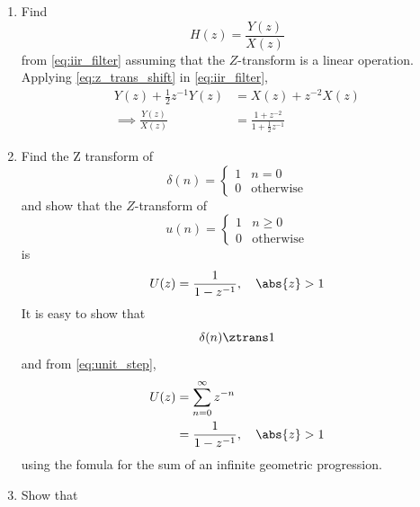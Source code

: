 \documentclass[journal,12pt,twocolumn]{IEEEtran}
\renewcommand\thesection{\arabic{section}}
\begin{document}
\begin{enumerate}[label=\thesection.\arabic*]
	\item Find
	      \begin{equation}
		      H(z) = \frac{Y(z)}{X(z)}
	      \end{equation}
	      from  \eqref{eq:iir_filter} assuming that the $Z$-transform is a linear operation.
	      \\
	      \solution  Applying \eqref{eq:z_trans_shift} in \eqref{eq:iir_filter},
	      \begin{align}
		      Y(z) + \frac{1}{2}z^{-1}Y(z) & = X(z)+z^{-2}X(z)
		      \\
		      \implies \frac{Y(z)}{X(z)}   & = \frac{1 + z^{-2}}{1 + \frac{1}{2}z^{-1}}
		      \label{eq:freq_resp}
	      \end{align}
	\item Find the Z transform of
	      \begin{equation}
		      \delta(n)
		      =
		      \begin{cases}
			      1 & n = 0
			      \\
			      0 & \text{otherwise}
		      \end{cases}
	      \end{equation}
	      and show that the $Z$-transform of
	      \begin{equation}
		      \label{eq:unit_step}
		      u(n)
		      =
		      \begin{cases}
			      1 & n \ge 0
			      \\
			      0 & \text{otherwise}
		      \end{cases}
	      \end{equation}
	      is
	      \begin{equation}
		      U(z) = \frac{1}{1-z^{-1}}, \quad \abs{z} > 1
	      \end{equation}
	      \solution It is easy to show that
	      \begin{equation}
		      \delta(n) \ztrans 1
	      \end{equation}
	      and from \eqref{eq:unit_step},
	      \begin{align}
		      U(z) & = \sum _{n= 0}^{\infty}z^{-n}
		      \\
		           & =\frac{1}{1-z^{-1}}, \quad \abs{z} > 1 \label{eq:unitstepztrans}
	      \end{align}
	      using the fomula for the sum of an infinite geometric progression.
	\item Show that
	      \begin{equation}

\end{equation}
\end{enumerate}
\end{document}
